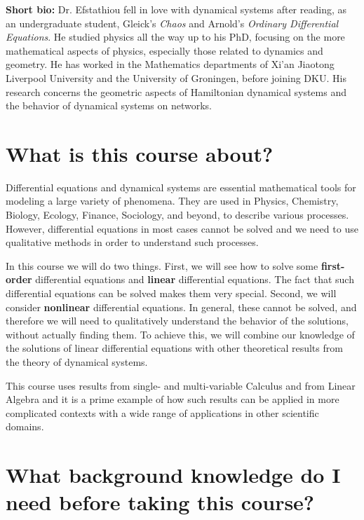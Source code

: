 \documentclass[11pt]{article}
\begin{document}
\textbf{Short bio:} Dr. Efstathiou fell in love with dynamical systems after reading, as an undergraduate student, Gleick's \emph{Chaos} and Arnold's \emph{Ordinary Differential Equations}. He studied physics all the way up to his PhD, focusing on the more mathematical aspects of physics, especially those related to dynamics and geometry.
He has worked in the Mathematics departments of Xi'an Jiaotong Liverpool University and the University of Groningen, before joining DKU. 
His research concerns the geometric aspects of Hamiltonian dynamical systems and the behavior of dynamical systems on networks.


\section{What is this course about?}

Differential equations and dynamical systems are essential mathematical tools for modeling a large variety of phenomena. They are used in Physics, Chemistry, Biology, Ecology, Finance, Sociology, and beyond, to describe various processes. However, differential equations in most cases cannot be solved and we need to use qualitative methods in order to understand such processes. 

In this course we will do two things. First, we will see how to solve some \textbf{first-order} differential equations and \textbf{linear} differential equations. The fact that such differential equations can be solved makes them very special. Second, we will consider \textbf{nonlinear} differential equations. In general, these cannot be solved, and therefore we will need to qualitatively understand the behavior of the solutions, without actually finding them. To achieve this, we will combine our knowledge of the solutions of linear differential equations with other theoretical results from the theory of dynamical systems. 

This course uses results from single- and multi-variable Calculus and from Linear Algebra and it is a prime example of how such results can be applied in more complicated contexts with a wide range of applications in other scientific domains. 


\section{What background knowledge do I need before taking this course?}
\end{document}
